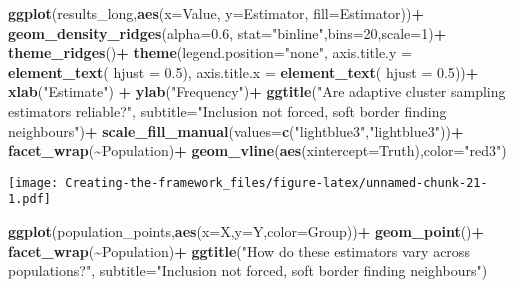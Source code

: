 \documentclass[
]{article}
\newenvironment{Shaded}{\begin{snugshade}}{\end{snugshade}}
\newcommand{\AttributeTok}[1]{\textcolor[rgb]{0.13,0.29,0.53}{#1}}
\newcommand{\DecValTok}[1]{\textcolor[rgb]{0.00,0.00,0.81}{#1}}
\newcommand{\FloatTok}[1]{\textcolor[rgb]{0.00,0.00,0.81}{#1}}
\newcommand{\FunctionTok}[1]{\textcolor[rgb]{0.13,0.29,0.53}{\textbf{#1}}}
\newcommand{\NormalTok}[1]{#1}
\newcommand{\SpecialCharTok}[1]{\textcolor[rgb]{0.81,0.36,0.00}{\textbf{#1}}}
\newcommand{\StringTok}[1]{\textcolor[rgb]{0.31,0.60,0.02}{#1}}
\begin{document}
\begin{Shaded}
\begin{Highlighting}[]
\FunctionTok{ggplot}\NormalTok{(results\_long,}\FunctionTok{aes}\NormalTok{(}\AttributeTok{x=}\NormalTok{Value, }\AttributeTok{y=}\NormalTok{Estimator, }\AttributeTok{fill=}\NormalTok{Estimator))}\SpecialCharTok{+}
  \FunctionTok{geom\_density\_ridges}\NormalTok{(}\AttributeTok{alpha=}\FloatTok{0.6}\NormalTok{, }\AttributeTok{stat=}\StringTok{"binline"}\NormalTok{,}\AttributeTok{bins=}\DecValTok{20}\NormalTok{,}\AttributeTok{scale=}\DecValTok{1}\NormalTok{)}\SpecialCharTok{+}
  \FunctionTok{theme\_ridges}\NormalTok{()}\SpecialCharTok{+}
  \FunctionTok{theme}\NormalTok{(}\AttributeTok{legend.position=}\StringTok{"none"}\NormalTok{,}
        \AttributeTok{axis.title.y =} \FunctionTok{element\_text}\NormalTok{( }\AttributeTok{hjust =} \FloatTok{0.5}\NormalTok{),}
        \AttributeTok{axis.title.x =} \FunctionTok{element\_text}\NormalTok{( }\AttributeTok{hjust =} \FloatTok{0.5}\NormalTok{))}\SpecialCharTok{+}
  \FunctionTok{xlab}\NormalTok{(}\StringTok{"Estimate"}\NormalTok{) }\SpecialCharTok{+}
  \FunctionTok{ylab}\NormalTok{(}\StringTok{"Frequency"}\NormalTok{)}\SpecialCharTok{+}
  \FunctionTok{ggtitle}\NormalTok{(}\StringTok{"Are adaptive cluster sampling estimators reliable?"}\NormalTok{,}
          \AttributeTok{subtitle=}\StringTok{"Inclusion not forced, soft border finding neighbours"}\NormalTok{)}\SpecialCharTok{+}
  \FunctionTok{scale\_fill\_manual}\NormalTok{(}\AttributeTok{values=}\FunctionTok{c}\NormalTok{(}\StringTok{"lightblue3"}\NormalTok{,}\StringTok{"lightblue3"}\NormalTok{))}\SpecialCharTok{+}
  \FunctionTok{facet\_wrap}\NormalTok{(}\SpecialCharTok{\textasciitilde{}}\NormalTok{Population)}\SpecialCharTok{+}
  \FunctionTok{geom\_vline}\NormalTok{(}\FunctionTok{aes}\NormalTok{(}\AttributeTok{xintercept=}\NormalTok{Truth),}\AttributeTok{color=}\StringTok{"red3"}\NormalTok{)}
\end{Highlighting}
\end{Shaded}

\texttt{[image: Creating-the-framework\_files/figure-latex/unnamed-chunk-21-1.pdf]}

\begin{Shaded}
\begin{Highlighting}[]
\FunctionTok{ggplot}\NormalTok{(population\_points,}\FunctionTok{aes}\NormalTok{(}\AttributeTok{x=}\NormalTok{X,}\AttributeTok{y=}\NormalTok{Y,}\AttributeTok{color=}\NormalTok{Group))}\SpecialCharTok{+}
  \FunctionTok{geom\_point}\NormalTok{()}\SpecialCharTok{+}
  \FunctionTok{facet\_wrap}\NormalTok{(}\SpecialCharTok{\textasciitilde{}}\NormalTok{Population)}\SpecialCharTok{+}
  \FunctionTok{ggtitle}\NormalTok{(}\StringTok{"How do these estimators vary across populations?"}\NormalTok{,}
          \AttributeTok{subtitle=}\StringTok{"Inclusion not forced, soft border finding neighbours"}\NormalTok{)}
\end{Highlighting}
\end{Shaded}
\end{document}
